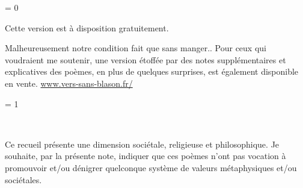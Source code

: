 \pagebreak

\ifnum \isPayant = 0
\begin{center}
    \vspace*{\fill}
    \begin{minipage}{0.8\linewidth}

    \centering
    Cette version est à disposition gratuitement.

    Malheureusement notre condition fait que sans manger..
    Pour ceux qui voudraient me soutenir, une version étoffée
    par des notes supplémentaires et explicatives des poèmes,
    en plus de quelques surprises,
    est également disponible en vente.
    \href{https://www.vers-sans-blason.fr/}{www.vers-sans-blason.fr/}

    \ifnum\poemIndex = 1

    ~\par
    
        Ce recueil présente une dimension sociétale, religieuse et philosophique.
        Je souhaite, par la présente note, indiquer que ces poèmes n'ont
        pas vocation à promouvoir et/ou dénigrer quelconque système de valeurs
        métaphysiques et/ou sociétales.
    \fi

    \end{minipage}
    \vspace*{\fill}
\end{center}
\newpage
\else
\ifcase\poemIndex
